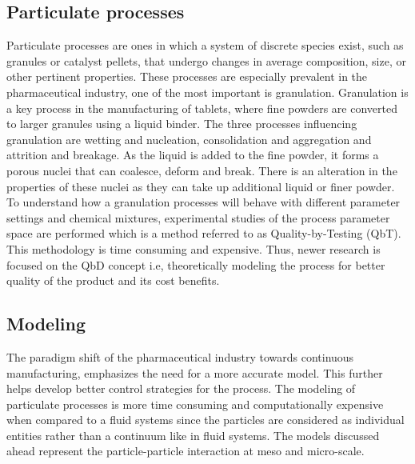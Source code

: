 \documentclass[preprint,11pt,authoryear]{elsarticle}
\begin{document}
\subsection{Particulate processes}
   Particulate processes are ones in which a system of discrete species exist, such as granules 
  or catalyst pellets, that undergo changes in average composition, size, or other pertinent 
  properties. These processes are especially prevalent in the pharmaceutical industry, one of the 
  most important is granulation. Granulation is a key process in the manufacturing of tablets, 
  where fine powders are converted to larger granules using a liquid binder. The three processes 
  influencing granulation are wetting and nucleation, consolidation and aggregation and attrition and 
  breakage\citep{Iveson2001}\citep{Cameron2005}. As the liquid is added to the fine powder, it 
  forms a porous nuclei that can coalesce, deform and break\citep{Barrasso2015ces}. There is an 
  alteration in the properties of these nuclei as they can take up additional liquid or finer powder.
   To understand how a granulation processes will behave with different parameter settings and 
  chemical mixtures, experimental studies of the process parameter space are performed which is a 
  method referred to as Quality-by-Testing (QbT). This methodology is time consuming and 
  expensive. Thus, newer research is focused on the QbD concept i.e, 
  theoretically modeling the process for better quality of the product and its cost benefits. 

\subsection{Modeling}
 The paradigm shift of the pharmaceutical industry towards continuous manufacturing, 
emphasizes the need for a more accurate model. This further helps develop better control strategies 
for the process. The modeling of particulate processes is more time consuming and computationally 
expensive when compared to a fluid systems since the particles are considered as individual entities 
rather than a continuum like in fluid systems. The models discussed ahead represent the 
particle-particle interaction at meso and micro-scale.
\end{document}
